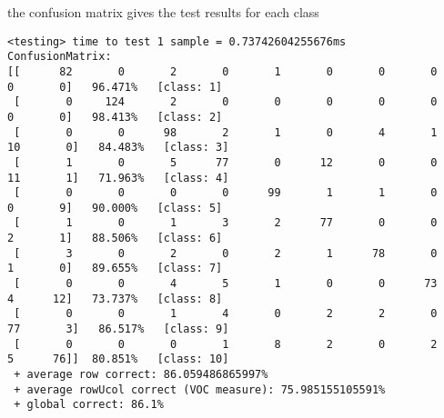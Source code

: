 the confusion matrix gives the test results for each class
\tiny
\begin{verbatim}
<testing> time to test 1 sample = 0.73742604255676ms	
ConfusionMatrix:
[[      82       0       2       0       1       0       0       0       0       0]   96.471% 	[class: 1]
 [       0     124       2       0       0       0       0       0       0       0]   98.413% 	[class: 2]
 [       0       0      98       2       1       0       4       1      10       0]   84.483% 	[class: 3]
 [       1       0       5      77       0      12       0       0      11       1]   71.963% 	[class: 4]
 [       0       0       0       0      99       1       1       0       0       9]   90.000% 	[class: 5]
 [       1       0       1       3       2      77       0       0       2       1]   88.506% 	[class: 6]
 [       3       0       2       0       2       1      78       0       1       0]   89.655% 	[class: 7]
 [       0       0       4       5       1       0       0      73       4      12]   73.737% 	[class: 8]
 [       0       0       1       4       0       2       2       0      77       3]   86.517% 	[class: 9]
 [       0       0       0       1       8       2       0       2       5      76]]  80.851% 	[class: 10]
 + average row correct: 86.059486865997% 
 + average rowUcol correct (VOC measure): 75.985155105591% 
 + global correct: 86.1%
\end{verbatim}
   \clearpage

\small
